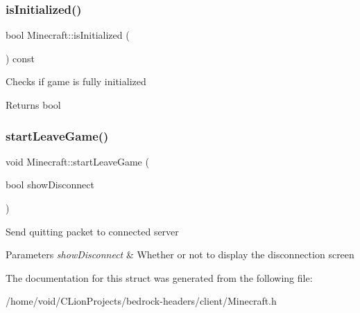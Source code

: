 \subsubsection{\texorpdfstring{isInitialized()}{isInitialized()}}
{\footnotesize\ttfamily bool Minecraft\+::is\+Initialized (\begin{DoxyParamCaption}{ }\end{DoxyParamCaption}) const}

Checks if game is fully initialized \begin{DoxyReturn}{Returns}
bool 
\end{DoxyReturn}
\mbox{\label{struct_minecraft_abe192960ddeb4dfd96d82d2f73b1d595}} 
\subsubsection{\texorpdfstring{startLeaveGame()}{startLeaveGame()}}
{\footnotesize\ttfamily void Minecraft\+::start\+Leave\+Game (\begin{DoxyParamCaption}\item[{bool}]{show\+Disconnect }\end{DoxyParamCaption})}

Send quitting packet to connected server 
\begin{DoxyParams}{Parameters}
{\em show\+Disconnect} & Whether or not to display the disconnection screen \\
\hline
\end{DoxyParams}


The documentation for this struct was generated from the following file\+:\begin{DoxyCompactItemize}
\item 
/home/void/\+C\+Lion\+Projects/bedrock-\/headers/client/Minecraft.\+h\end{DoxyCompactItemize}
